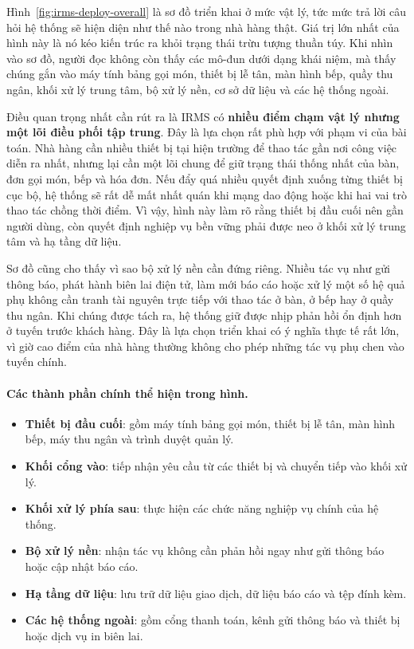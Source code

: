 \documentclass[11pt,a4paper]{article}
\begin{document}
Hình~\ref{fig:irms-deploy-overall} là sơ đồ triển khai ở mức vật lý, tức mức trả lời câu hỏi hệ thống sẽ hiện diện như thế nào trong nhà hàng thật. Giá trị lớn nhất của hình này là nó kéo kiến trúc ra khỏi trạng thái trừu tượng thuần túy. Khi nhìn vào sơ đồ, người đọc không còn thấy các mô-đun dưới dạng khái niệm, mà thấy chúng gắn vào máy tính bảng gọi món, thiết bị lễ tân, màn hình bếp, quầy thu ngân, khối xử lý trung tâm, bộ xử lý nền, cơ sở dữ liệu và các hệ thống ngoài.

Điều quan trọng nhất cần rút ra là IRMS có \textbf{nhiều điểm chạm vật lý nhưng một lõi điều phối tập trung}. Đây là lựa chọn rất phù hợp với phạm vi của bài toán. Nhà hàng cần nhiều thiết bị tại hiện trường để thao tác gần nơi công việc diễn ra nhất, nhưng lại cần một lõi chung để giữ trạng thái thống nhất của bàn, đơn gọi món, bếp và hóa đơn. Nếu đẩy quá nhiều quyết định xuống từng thiết bị cục bộ, hệ thống sẽ rất dễ mất nhất quán khi mạng dao động hoặc khi hai vai trò thao tác chồng thời điểm. Vì vậy, hình này làm rõ rằng thiết bị đầu cuối nên gần người dùng, còn quyết định nghiệp vụ bền vững phải được neo ở khối xử lý trung tâm và hạ tầng dữ liệu.

Sơ đồ cũng cho thấy vì sao bộ xử lý nền cần đứng riêng. Nhiều tác vụ như gửi thông báo, phát hành biên lai điện tử, làm mới báo cáo hoặc xử lý một số hệ quả phụ không cần tranh tài nguyên trực tiếp với thao tác ở bàn, ở bếp hay ở quầy thu ngân. Khi chúng được tách ra, hệ thống giữ được nhịp phản hồi ổn định hơn ở tuyến trước khách hàng. Đây là lựa chọn triển khai có ý nghĩa thực tế rất lớn, vì giờ cao điểm của nhà hàng thường không cho phép những tác vụ phụ chen vào tuyến chính.

\paragraph{Các thành phần chính thể hiện trong hình.}
\begin{itemize}
  \item \textbf{Thiết bị đầu cuối}: gồm máy tính bảng gọi món, thiết bị lễ tân, màn hình bếp, máy thu ngân và trình duyệt quản lý.
  \item \textbf{Khối cổng vào}: tiếp nhận yêu cầu từ các thiết bị và chuyển tiếp vào khối xử lý.
  \item \textbf{Khối xử lý phía sau}: thực hiện các chức năng nghiệp vụ chính của hệ thống.
  \item \textbf{Bộ xử lý nền}: nhận tác vụ không cần phản hồi ngay như gửi thông báo hoặc cập nhật báo cáo.
  \item \textbf{Hạ tầng dữ liệu}: lưu trữ dữ liệu giao dịch, dữ liệu báo cáo và tệp đính kèm.
  \item \textbf{Các hệ thống ngoài}: gồm cổng thanh toán, kênh gửi thông báo và thiết bị hoặc dịch vụ in biên lai.
\end{itemize}
\end{document}
